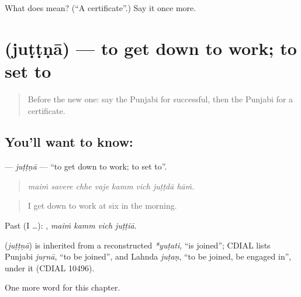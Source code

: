 \begin{tcolorbox}[breakable,colback=teal!4,colframe=teal!35!black,title={Before you move on}]
What does  mean? (\textquotedblleft{}A certificate\textquotedblright{}.) Say it once more.
\end{tcolorbox}
\section[\texorpdfstring{\pa{ਜੁੱਟਣਾ} (juṭṭṇā)}{ਜੁੱਟਣਾ (juṭṭṇā)}]{ (juṭṭṇā) — to get down to work; to set to}

\label{lesson:PA-C364-juttna}



\begin{quote}
Before the new one: say the Punjabi for successful, then the Punjabi for a certificate.
\end{quote}

\subsection*{You'll want to know: }
\textbf{} — \emph{juṭṭṇā} — \textquotedblleft{}to get down to work; to set to\textquotedblright{}.

\begin{quote}
       
\end{quote}

\begin{quote}
\emph{maiṁ savere chhe vaje kamm vich juṭṭdā hāṁ.}
\end{quote}

\begin{quote}
I get down to work at six in the morning.
\end{quote}

Past (I …):    , \emph{maiṁ kamm vich juṭṭiā}.

\begin{cousinweb}
\textbf{} (\emph{juṭṭṇā}) is inherited from a reconstructed \emph{*yuṭati}, \textquotedblleft{}is joined\textquotedblright{}; CDIAL lists Punjabi \emph{juṛnā}, \textquotedblleft{}to be joined\textquotedblright{}, and Lahnda \emph{juṭaṇ}, \textquotedblleft{}to be joined, be engaged in\textquotedblright{}, under it (CDIAL 10496).
\end{cousinweb}

\begin{grammarlens}[title={What you've built}]
One more word for this chapter.
\end{grammarlens}

